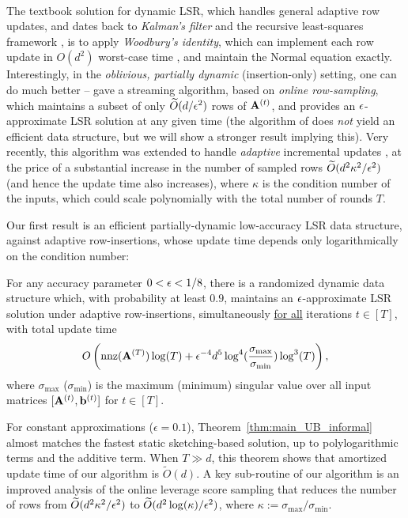 \

The textbook solution for dynamic LSR, which handles general adaptive row updates, and dates back to \emph{Kalman's filter} and the recursive least-squares framework \cite{k60},  
is to apply 
\emph{Woodbury's identity}, 
which can implement each row update in $O(d^2)$ worst-case time \cite{k60}, and maintain the Normal equation exactly.
Interestingly, in the \emph{oblivious, partially dynamic} (insertion-only) setting, one can do much better --  \cite{cmp20} gave a streaming algorithm, based on \emph{online row-sampling}, which  maintains a subset of only $\widetilde{O}(d/\epsilon^2)$ rows of $\mathbf{A}^{(t)}$, and provides an $\epsilon$-approximate LSR solution at any given time (the algorithm of \cite{cmp20} does \emph{not} yield an efficient data structure, but we will show a stronger result implying this).  Very recently, this algorithm was extended to handle \emph{adaptive} incremental updates \cite{bhm+21}, at the price of a substantial increase in the number of sampled rows $\widetilde{O}(d^2\kappa^2/\epsilon^2)$  (and hence the update time also increases), where $\kappa$ is the condition number of the inputs, which could scale polynomially with the total number of rounds $T$.


Our first result is an efficient partially-dynamic low-accuracy LSR data structure, against adaptive row-insertions, whose update time depends only logarithmically on the condition number:   

\begin{theorem} \label{thm:main_UB_informal}
For any accuracy parameter $0 < \epsilon < 1/8$, there is a randomized dynamic data structure which, 
with probability at least $0.9$, maintains an $\epsilon$-approximate LSR solution under adaptive row-insertions, 
simultaneously \underline{for all} iterations $t\in[T]$, with total update time 
\[ O\left(\operatorname{nnz}(\mathbf{A}^{(T)}) \log(T) + \epsilon^{-4} d^5 \log^4(\frac{\sigma_{\max}}{\sigma_{\min}}) \log^3(T)\right), \]
where $\sigma_{\max}$ ($\sigma_{\min}$) is the maximum (minimum) singular value over all input matrices $[\mathbf{A}^{(t)}, \mathbf{b}^{(t)}]$ for $t\in [T]$.
\end{theorem}
For constant approximations ($\epsilon = 0.1$), Theorem~\ref{thm:main_UB_informal} almost matches the fastest static sketching-based solution, up to polylogarithmic terms and the additive term. When $T \gg d$, this theorem shows that amortized update time of our algorithm is $\tilde{O}(d)$. A key sub-routine of our algorithm is an improved analysis of the online leverage score sampling that reduces the number of rows from $\widetilde{O}(d^2\kappa^2/\epsilon^2)$ to  $\widetilde{O}(d^2 \log(\kappa)/\epsilon^2)$, where $\kappa:=\sigma_{\max}/\sigma_{\min}$.



